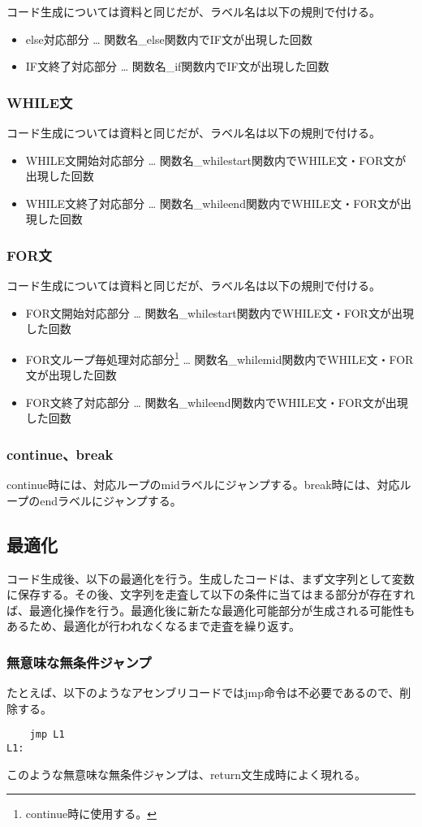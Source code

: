 \documentclass[titlepage, a4paper,12pt]{jarticle}
\begin{document}
コード生成については資料と同じだが、ラベル名は以下の規則で付ける。
\begin{itemize}
\item else対応部分 … {関数名}\_else{関数内でIF文が出現した回数}
\item IF文終了対応部分 … {関数名}\_if{関数内でIF文が出現した回数}
\end{itemize}
\subsubsection{WHILE文}
コード生成については資料と同じだが、ラベル名は以下の規則で付ける。
\begin{itemize}
\item WHILE文開始対応部分 … {関数名}\_whilestart{関数内でWHILE文・FOR文が出現した回数}
\item WHILE文終了対応部分 … {関数名}\_whileend{関数内でWHILE文・FOR文が出現した回数}
\end{itemize}
\subsubsection{FOR文}
コード生成については資料と同じだが、ラベル名は以下の規則で付ける。
\begin{itemize}
\item FOR文開始対応部分 … {関数名}\_whilestart{関数内でWHILE文・FOR文が出現した回数}
\item FOR文ループ毎処理対応部分\footnote{continue時に使用する。} … {関数名}\_whilemid{関数内でWHILE文・FOR文が出現した回数}
\item FOR文終了対応部分 … {関数名}\_whileend{関数内でWHILE文・FOR文が出現した回数}
\end{itemize}
\subsubsection{continue、break}
continue時には、対応ループのmidラベルにジャンプする。break時には、対応ループのendラベルにジャンプする。
\subsection{最適化}
コード生成後、以下の最適化を行う。生成したコードは、まず文字列として変数に保存する。その後、文字列を走査して以下の条件に当てはまる部分が存在すれば、最適化操作を行う。最適化後に新たな最適化可能部分が生成される可能性もあるため、最適化が行われなくなるまで走査を繰り返す。
\subsubsection{無意味な無条件ジャンプ}
たとえば、以下のようなアセンブリコードではjmp命令は不必要であるので、削除する。
\begin{verbatim}
    jmp L1
L1:
\end{verbatim}
このような無意味な無条件ジャンプは、return文生成時によく現れる。
\end{document}
